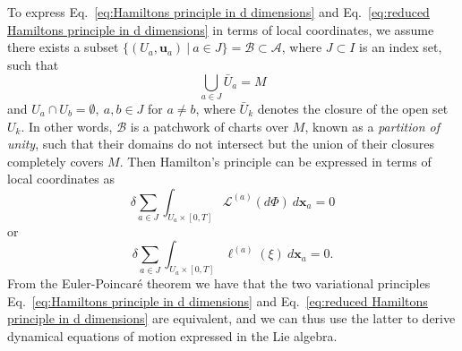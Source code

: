 To express Eq.~\ref{eq:Hamiltons principle in d dimensions} and Eq.~\ref{eq:reduced Hamiltons principle in d dimensions} in terms of local coordinates, we assume there exists a subset $\{ (U_a, \mathbf{u}_a)\ |\ a \in J \} = \mathcal{B} \subset \mathcal{A}$, where $J \subset I$ is an index set, such that
\begin{equation}
\bigcup_{a \in J} \bar{U}_a = M 
\end{equation}
and $U_a \cap U_b = \emptyset,\ a,b \in J$ for $a \neq b$, where $\bar{U}_k$ denotes the closure of the open set $U_k$. In other words, $\mathcal{B}$ is a patchwork of charts over $M$, known as a \textit{partition of unity}, such that their domains do not intersect but the union of their closures completely covers $M$. Then Hamilton's principle can be expressed in terms of local coordinates as
\begin{equation}
\delta \sum_{a \in J} \int_{ U_a \times [0, T] } \mathcal{L}^{(a)}(d\Phi)\ d\mathbf{x}_a = 0
\end{equation}
or
\begin{equation}
\delta \sum_{a \in J} \int_{ U_a \times [0, T] } \ell^{(a)}(\xi)\ d\mathbf{x}_a = 0.
\end{equation}
From the Euler-Poincaré theorem \citep{marleHenriPoincareNote2013, poincareFormeNouvelleEquations1901, marsdenIntroductionMechanicsSymmetry2013} we have that the two variational principles Eq.~\ref{eq:Hamiltons principle in d dimensions} and Eq.~\ref{eq:reduced Hamiltons principle in d dimensions} are equivalent, and we can thus use the latter to derive dynamical equations of motion expressed in the Lie algebra.




